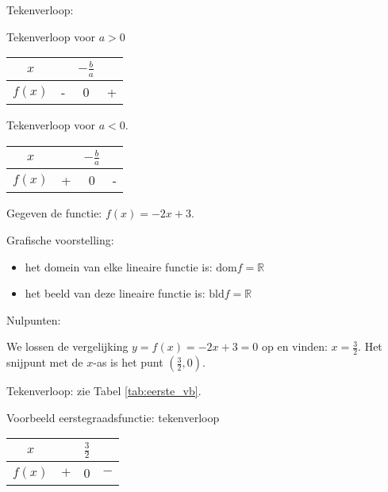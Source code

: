 Tekenverloop: 
\begin{tabel}{Tekenverloop voor $a>0$}
	\centering\begin{tabular}{c||c|c|c}
		$x$ &  & $-\frac{b}{a}$ & \\
		\hline 
		$f(x)$ & - & 0 & +\\
	\end{tabular}
\end{tabel}

\begin{tabel}{Tekenverloop voor $a<0$.}
	\centering\begin{tabular}{c||c|c|c}
		$x$ &  & $-\frac{b}{a}$ & \\
		\hline 
		$f(x)$ & + & 0 & -\\
	\end{tabular}
	\label{tab:eerst_akl0}
\end{tabel}

\begin{voorbeeld}
	Gegeven de functie: $f(x)=-2x+3$.
	

Grafische voorstelling:
\begin{itemize}
\item het domein van elke lineaire functie is: $\textrm{dom}f=\mathbb{R}$
\item het beeld van deze lineaire functie is: $\textrm{bld}f=\mathbb{R}$
\end{itemize}



Nulpunten:

We lossen de vergelijking $y=f(x)=-2x+3=0$ op en vinden:
$x=\frac{3}{2}$. Het snijpunt met de $x$-as is het punt $(\frac{3}{2},0)$.

Tekenverloop: zie Tabel \ref{tab:eerste_vb}.

\begin{tabel}{Voorbeeld eerstegraadsfunctie: tekenverloop}
\begin{tabular}{c||c|c|c}
	$x$ &  & $\frac{3}{2}$ & \\
	\hline 
	$f(x)$ & $+$ & 0 & $-$\\
\end{tabular}
\label{tab:eerste_vb}	
\end{tabel}

\end{voorbeeld}

